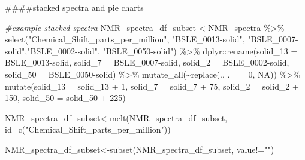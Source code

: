 \documentclass[
]{article}
\newenvironment{Shaded}{\begin{snugshade}}{\end{snugshade}}
\newcommand{\AttributeTok}[1]{\textcolor[rgb]{0.77,0.63,0.00}{#1}}
\newcommand{\CommentTok}[1]{\textcolor[rgb]{0.56,0.35,0.01}{\textit{#1}}}
\newcommand{\ConstantTok}[1]{\textcolor[rgb]{0.00,0.00,0.00}{#1}}
\newcommand{\DecValTok}[1]{\textcolor[rgb]{0.00,0.00,0.81}{#1}}
\newcommand{\FunctionTok}[1]{\textcolor[rgb]{0.00,0.00,0.00}{#1}}
\newcommand{\NormalTok}[1]{#1}
\newcommand{\OtherTok}[1]{\textcolor[rgb]{0.56,0.35,0.01}{#1}}
\newcommand{\SpecialCharTok}[1]{\textcolor[rgb]{0.00,0.00,0.00}{#1}}
\newcommand{\StringTok}[1]{\textcolor[rgb]{0.31,0.60,0.02}{#1}}
\begin{document}
\#\#\#\#stacked spectra and pie charts

\begin{Shaded}
\begin{Highlighting}[]
\CommentTok{\#example stacked spectra}
\NormalTok{NMR\_spectra\_df\_subset }\OtherTok{\textless{}{-}}\NormalTok{NMR\_spectra }\SpecialCharTok{\%\textgreater{}\%}
  \FunctionTok{select}\NormalTok{(}\StringTok{"Chemical\_Shift\_parts\_per\_million"}\NormalTok{, }\StringTok{"BSLE\_0013{-}solid"}\NormalTok{, }\StringTok{"BSLE\_0007{-}solid"}\NormalTok{,}\StringTok{"BSLE\_0002{-}solid"}\NormalTok{, }\StringTok{"BSLE\_0050{-}solid"}\NormalTok{) }\SpecialCharTok{\%\textgreater{}\%}
\NormalTok{  dplyr}\SpecialCharTok{::}\FunctionTok{rename}\NormalTok{(}\StringTok{\textquotesingle{}solid\_13\textquotesingle{}} \OtherTok{=} \StringTok{\textquotesingle{}BSLE\_0013{-}solid\textquotesingle{}}\NormalTok{,}
                \StringTok{\textquotesingle{}solid\_7\textquotesingle{}} \OtherTok{=} \StringTok{\textquotesingle{}BSLE\_0007{-}solid\textquotesingle{}}\NormalTok{,}
                \StringTok{\textquotesingle{}solid\_2\textquotesingle{}} \OtherTok{=} \StringTok{\textquotesingle{}BSLE\_0002{-}solid\textquotesingle{}}\NormalTok{,}
                \StringTok{\textquotesingle{}solid\_50\textquotesingle{}} \OtherTok{=} \StringTok{\textquotesingle{}BSLE\_0050{-}solid\textquotesingle{}}\NormalTok{) }\SpecialCharTok{\%\textgreater{}\%}
  \FunctionTok{mutate\_all}\NormalTok{(}\SpecialCharTok{\textasciitilde{}}\FunctionTok{replace}\NormalTok{(., . }\SpecialCharTok{==} \DecValTok{0}\NormalTok{, }\ConstantTok{NA}\NormalTok{)) }\SpecialCharTok{\%\textgreater{}\%}
  \FunctionTok{mutate}\NormalTok{(}\AttributeTok{solid\_13 =}\NormalTok{ solid\_13 }\SpecialCharTok{+} \DecValTok{1}\NormalTok{,}
         \AttributeTok{solid\_7 =}\NormalTok{ solid\_7 }\SpecialCharTok{+} \DecValTok{75}\NormalTok{,}
         \AttributeTok{solid\_2 =}\NormalTok{ solid\_2 }\SpecialCharTok{+} \DecValTok{150}\NormalTok{,}
         \AttributeTok{solid\_50 =}\NormalTok{ solid\_50 }\SpecialCharTok{+} \DecValTok{225}\NormalTok{) }
         
\NormalTok{NMR\_spectra\_df\_subset}\OtherTok{\textless{}{-}}\FunctionTok{melt}\NormalTok{(NMR\_spectra\_df\_subset, }\AttributeTok{id=}\FunctionTok{c}\NormalTok{(}\StringTok{"Chemical\_Shift\_parts\_per\_million"}\NormalTok{))}

\NormalTok{NMR\_spectra\_df\_subset}\OtherTok{\textless{}{-}}\FunctionTok{subset}\NormalTok{(NMR\_spectra\_df\_subset, value}\SpecialCharTok{!=}\StringTok{""}\NormalTok{)}


\end{Highlighting}
\end{Shaded}
\end{document}
